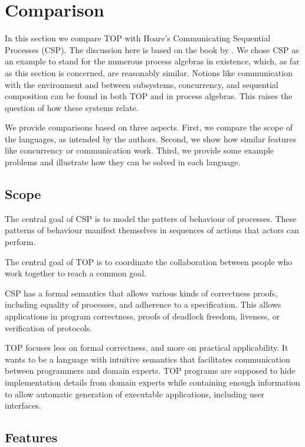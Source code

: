 
\section{Comparison}

In this section we compare TOP with Hoare's Communicating Sequential Processes (CSP).
The discussion here is based on the book by \citet{books/Hoare85CSP}.
We chose CSP as an example to stand for the numerous process algebras in existence, which, as far as this section is concerned, are reasonably similar.
Notions like communication with the environment and between subsystems, concurrency, and sequential composition can be found in both TOP and in process algebras.
This raises the question of how these systems relate.

We provide comparisons based on three aspects.
First, we compare the scope of the languages, as intended by the authors.
Second, we show how similar features like concurrency or communication work.
Third, we provide some example problems and illustrate how they can be solved in each language.


\subsection{Scope}

The central goal of CSP is to model the patters of behaviour of processes.
These patterns of behaviour manifest themselves in sequences of actions that actors can perform.

The central goal of TOP is to coordinate the collaboration between people who work together to reach a common goal.

CSP has a formal semantics that allows various kinds of correctness proofs, including equality of processes, and adherence to a specification.
This allows applications in program correctness, proofs of deadlock freedom, liveness, or verification of protocols.

TOP focuses less on formal correctness, and more on practical applicability.
It wants to be a language with intuitive semantics that facilitates communication between programmers and domain experts.
TOP programs are supposed to hide implementation details from domain experts while containing enough information to allow automatic generation of executable applications, including user interfaces.


\subsection{Features}

